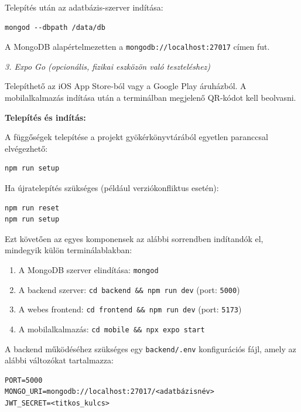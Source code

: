 \noindent Telepítés után az adatbázis-szerver indítása:
\begin{verbatim}
mongod --dbpath /data/db
\end{verbatim}

\noindent A MongoDB alapértelmezetten a \texttt{mongodb://localhost:27017} címen fut.

\vskip 0.3cm

\noindent \textit{3. Expo Go (opcionális, fizikai eszközön való teszteléshez)}

\noindent Telepíthető az iOS App Store-ból vagy a Google Play áruházból. A mobilalkalmazás indítása után a terminálban megjelenő QR-kódot kell beolvasni.

\vskip 0.5cm

\noindent \textbf{Telepítés és indítás:}

A függőségek telepítése a projekt gyökérkönyvtárából egyetlen paranccsal elvégezhető:

\begin{verbatim}
npm run setup
\end{verbatim}

Ha újratelepítés szükséges (például verziókonfliktus esetén):

\begin{verbatim}
npm run reset
npm run setup
\end{verbatim}

Ezt követően az egyes komponensek az alábbi sorrendben indítandók el, mindegyik külön terminálablakban:

\begin{enumerate}
    \item A MongoDB szerver elindítása: \texttt{mongod}
    \item A backend szerver: \texttt{cd backend \&\& npm run dev} \hfill (port: \texttt{5000})
    \item A webes frontend: \texttt{cd frontend \&\& npm run dev} \hfill (port: \texttt{5173})
    \item A mobilalkalmazás: \texttt{cd mobile \&\& npx expo start}
\end{enumerate}

A backend működéséhez szükséges egy \texttt{backend/.env} konfigurációs fájl, amely az alábbi változókat tartalmazza:

\begin{verbatim}
PORT=5000
MONGO_URI=mongodb://localhost:27017/<adatbázisnév>
JWT_SECRET=<titkos_kulcs>
\end{verbatim}